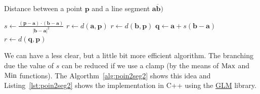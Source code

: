 {\centering
\begin{minipage}{\linewidth}
  \begin{algorithm}[H]
    \caption{Distance between a point $\mathbf{p}$ and a line segment $\overline{\mathbf{a}\mathbf{b})}$}
    \label{alg:poin2seg}
    \begin{algorithmic}[1] %
       
         
          \State {}
        \EndIf
        \State $s \gets \frac{(\mathbf{p} - \mathbf{a}) \cdot (\mathbf{b} - \mathbf{a})}{|\mathbf{b} - \mathbf{a}|^2}$ 
         
          \State $r \gets d(\mathbf{a},\mathbf{p})$
          
          \State $r \gets d(\mathbf{b},\mathbf{p})$
        \Else {}
          \State $\mathbf{q} \gets \mathbf{a} + s (\mathbf{b} - \mathbf{a})$ 
          \State $r \gets d(\mathbf{q},\mathbf{p})$
        \EndIf
        \State {}
      \EndProcedure
    \end{algorithmic}
  \end{algorithm}
\end{minipage}
\par
}

We can have a less clear, but a little bit more efficient algorithm.
The branching due the value of $s$ can be reduced if we use a clamp (by the means of $\operatorname{Max}$ and $\operatorname{Min}$ functions).
The Algorthm~\ref{alg:poin2seg2} shows this idea and Listing~\ref{lst:poin2seg2} shows the implementation in C++ using the \href{https://glm.g-truc.net}{GLM} library.

